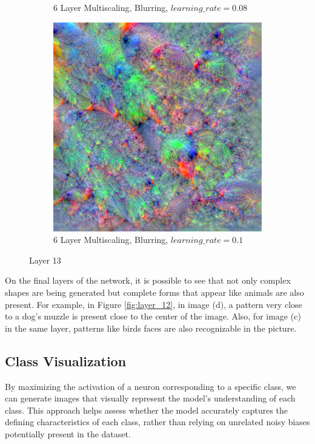 \begin{figure}
\begin{subfigure}[t]{0.31\textwidth}
        \caption{6 Layer Multiscaling, Blurring, \(learning\_rate = 0.08\)}
    \end{subfigure}
    \hfill
    \begin{subfigure}[t]{0.31\textwidth}
        \captionsetup{justification=centering}
        \centering
        \includegraphics[width=.7\linewidth]{figuras/feat_vis/experiments/layers/final/l13/random_image_pl6_lr1e-1_layer28_blur-0.4.png}
        \caption{6 Layer Multiscaling, Blurring, \(learning\_rate = 0.1\)}
    \end{subfigure}

    \caption{Layer 13}
    \label{fig:layer_13}
\end{figure}
 
On the final layers of the network, it is possible to see that not only complex shapes are being generated but complete forms that appear like animals are also present.
For example, in Figure \ref{fig:layer_12}, in image (d), a pattern very close to a dog's muzzle is present close to the center of the image. 
Also, for image (c) in the same layer, patterns like birds faces are also recognizable in the picture.

\subsection{Class Visualization}

By maximizing the activation of a neuron corresponding to a specific class, we can generate images that visually represent the model's understanding of each class. 
This approach helps assess whether the model accurately captures the defining characteristics of each class, rather than relying on unrelated noisy biases potentially present in the dataset.

